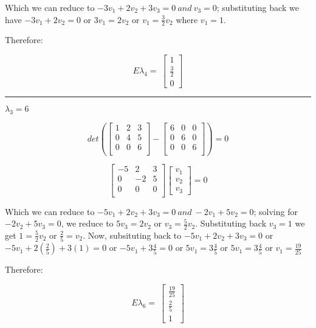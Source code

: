 \documentclass[]{article}
\begin{document}
Which we can reduce to \(-3v_1+2v_2+3v_3 = 0~and~v_3 =0\); substituting
back we have \(-3v_1+2v_2=0\) or \(3v_1=2v_2\) or \(v_1=\frac{3}{2}v_2\)
where \(v_1 =1\).

Therefore:

\[
E\lambda_4 = \
\begin{bmatrix}
1 \\
\frac{3}{2} \\
0
\end{bmatrix}
\]

\begin{center}\rule{0.5\linewidth}{\linethickness}\end{center}

\(\lambda_3 = 6\)

\[
det( 
\begin{bmatrix}
   1 & 2 & 3 \\
   0 & 4 & 5 \\
   0 & 0 & 6 \\
\end{bmatrix}
-
\begin{bmatrix}
   6 & 0 & 0 \\
   0 & 6 & 0 \\
   0 & 0 & 6 \\
\end{bmatrix}
) = 0
\]

\[
\begin{bmatrix}
   -5 & 2 & 3 \\
   0 & -2 & 5 \\
   0 & 0 & 0 \\
\end{bmatrix}
\begin{bmatrix}
v_1 \\
v_2 \\
v_3
\end{bmatrix}
=0
\]

Which we can reduce to \(-5v_1+2v_2+3v_3 = 0~and~-2v_1+5v_2=0\); solving
for \(-2v_2+5v_3=0\), we reduce to \(5v_3=2v_2\) or
\(v_3=\frac{5}{2}v_2\). Substituting back \(v_3=1\) we get
\(1=\frac{5}{2}v_2\) or \(\frac{2}{5}=v_2\). Now, subsituting back to
\(-5v_1+2v_2+3v_3 = 0\) or \(-5v_1+2(\frac{2}{5})+3(1) = 0\) or
\(-5v_1+3\frac{4}{5}= 0\) or \(5v_1= 3\frac{4}{5}\) or
\(5v_1= 3\frac{4}{5}\) or \(v_1= \frac{19}{25}\)

Therefore:

\[
E\lambda_6 = \
\begin{bmatrix}
\frac{19}{25} \\
\frac{2}{5} \\
1
\end{bmatrix}
\]
\end{document}
